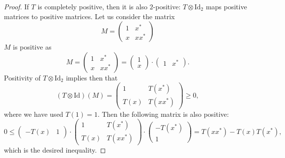 \documentclass{article}
\newcommand{\id}{\mathrm{Id}}
\begin{document}
\begin{proof}
  If $T$ is completely positive, then it is also $2$-positive: $T\otimes \id_2$ maps positive matrices to positive matrices. Let us consider the matrix 
  \begin{equation*}
   M = \left(\begin{matrix} 1 & x^* \\ x & xx^* \end{matrix}\right)
  \end{equation*}
  $M$ is positive as 
  \begin{equation*}
   M = \left(\begin{matrix} 1 & x^* \\ x & xx^* \end{matrix}\right)
   = \left(\begin{matrix} 1  \\ x \end{matrix}\right) \cdot \left(\begin{matrix} 1 & x^*  \end{matrix}\right). 
  \end{equation*}
  Positivity of $T\otimes \id_2$ implies then that 
  \begin{equation*}
   (T\otimes\id)(M) = \left(\begin{matrix} 1 & T(x^*) \\ T(x) & T(xx^*) \end{matrix}\right) \geq 0, 
  \end{equation*}
  where we have used $T(1)=1$. Then the following matrix is also positive:
  \begin{equation*}
   0 \leq \left(\begin{matrix} -T(x) & 1 \end{matrix}\right) \cdot
          \left(\begin{matrix} 1 & T(x^*) \\ T(x) & T(xx^*) \end{matrix}\right) \cdot
          \left(\begin{matrix} -T(x^*) \\ 1 \end{matrix}\right) = T(xx^*) - T(x)T(x^*),
  \end{equation*}
  which is the desired inequality.
  

\end{proof}
\end{document}
